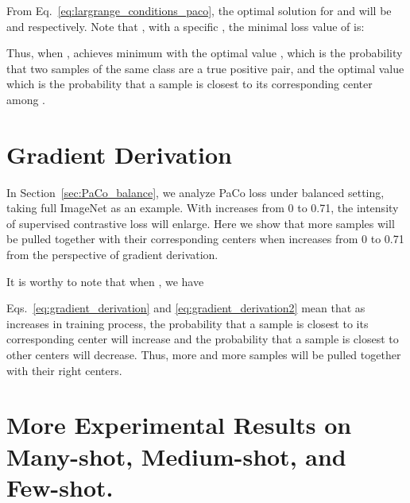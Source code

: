 \documentclass[10pt,twocolumn,letterpaper]{article}
\begin{document}
From Eq.~\eqref{eq:largrange_conditions_paco}, the optimal solution for  and  will be  and  respectively. Note that ,  with a specific , the minimal loss value of  is:



Thus, when ,  achieves minimum with the optimal value  , which is the probability that two samples of the same class are a true positive pair, and the optimal value  which is the probability that a sample is closest to its corresponding center  among .

\newpage
\section{Gradient Derivation}
In Section~\ref{sec:PaCo_balance}, we analyze PaCo loss under balanced setting, taking full ImageNet as an example. With  increases from 0 to 0.71, the intensity of supervised contrastive loss will enlarge. Here we show that more samples will be pulled together with their corresponding centers when  increases from 0 to 0.71 from the perspective of gradient derivation.



It is worthy to note that when , we have

Eqs.~\eqref{eq:gradient_derivation} and \eqref{eq:gradient_derivation2} mean that as  increases in training process, the probability that a sample is closest to its corresponding center will increase and the probability that a sample is closest to other centers will decrease. Thus, more and more samples will be pulled together with their right centers.

\section{More Experimental Results on Many-shot, Medium-shot, and Few-shot.}
\end{document}
